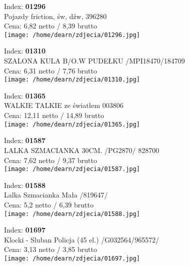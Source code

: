 {Index: \textbf{01296}\\
Pojazdy friction, św, dźw, 396280\\
Cena: 6,82 netto / 8,39 brutto\\
  \texttt{[image: /home/dearn/zdjecia/01296.jpg]}}\newline\newline

{Index: \textbf{01310}\\
SZALONA KULA B/O.W PUDEŁKU /MPI18470/184709\\
Cena: 6,31 netto / 7,76 brutto\\
  \texttt{[image: /home/dearn/zdjecia/01310.jpg]}}\newline\newline

{Index: \textbf{01365}\\
WALKIE TALKIE ze światłem 003806\\
Cena: 12,11 netto / 14,89 brutto\\
  \texttt{[image: /home/dearn/zdjecia/01365.jpg]}}\newline\newline

{Index: \textbf{01587}\\
LALKA SZMACIANKA 30CM. /PG2870/                 828700\\
Cena: 7,62 netto / 9,37 brutto\\
  \texttt{[image: /home/dearn/zdjecia/01587.jpg]}}\newline\newline

{Index: \textbf{01588}\\
Lalka Szmacianka Mała /819647/\\
Cena: 5,2 netto / 6,39 brutto\\
  \texttt{[image: /home/dearn/zdjecia/01588.jpg]}}\newline\newline

{Index: \textbf{01697}\\
Klocki - Sluban Policja (45 el.) /G032564/965572/\\
Cena: 3,13 netto / 3,85 brutto\\
  \texttt{[image: /home/dearn/zdjecia/01697.jpg]}}\newline\newline

